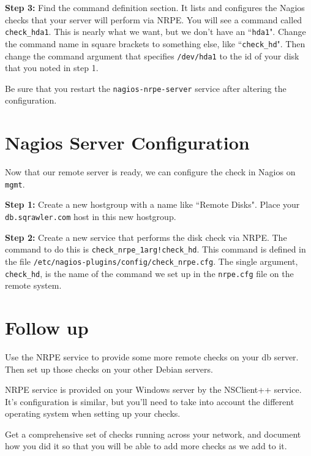 \documentclass{article}   	%
\begin{document}
\textbf{Step 3:} Find the command definition section.  It lists and configures the Nagios checks that your server will perform via NRPE.  You will see a command called \texttt{check\_hda1}.  This is nearly what we want, but we don't have an ``\texttt{hda1}".  Change the command name in square brackets to something else, like ``\texttt{check\_hd}".  Then change the command argument that specifies \texttt{/dev/hda1} to the id of your disk that you noted in step 1.

Be sure that you restart the \texttt{nagios-nrpe-server} service after altering the configuration.

\section{Nagios Server Configuration}
Now that our remote server is ready, we can configure the check in Nagios on \texttt{mgmt}.

\textbf{Step 1:} Create a new hostgroup with a name like ``Remote Disks".  Place your \texttt{db.sqrawler.com} host in this new hostgroup.

\textbf{Step 2:}  Create a new service that performs the disk check via NRPE.  The command to do this is \texttt{check\_nrpe\_1arg!check\_hd}.  This command is defined in the file \texttt{/etc/nagios-plugins/config/check\_nrpe.cfg}.  The single argument, \texttt{check\_hd}, is the name of the command we set up in the \texttt{nrpe.cfg} file on the remote system.

\section{Follow up}
Use the NRPE service to provide some more remote checks on your db server.  Then set up those checks on your other Debian servers.

NRPE service is provided on your Windows server by the NSClient++ service.  It's configuration is similar, but you'll need to take into account the different operating system when setting up your checks.

Get a comprehensive set of checks running across your network, and document how you did it so that you will be able to add more checks as we add to it.
\end{document}
